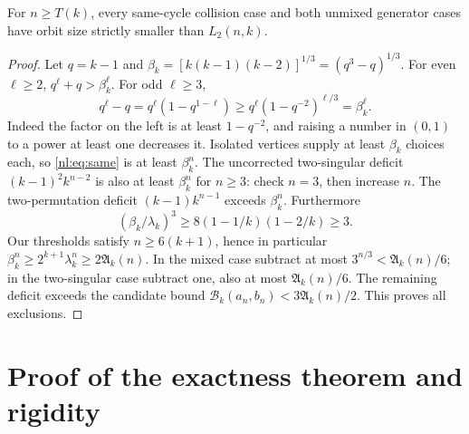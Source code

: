 \documentclass[11pt,a4paper]{article}
\numberwithin{equation}{section}
\theoremstyle{definition}
\theoremstyle{remark}
\newcommand{\Bip}{\mathcal B}
\newcommand{\nlenv}{\mathfrak A}
\begin{document}
\begin{lemma}\label{nl:lem:othercases}
For $n\ge T(k)$, every same-cycle collision case and both unmixed
generator cases have orbit size strictly smaller than $L_2(n,k)$.
\end{lemma}
\begin{proof}
Let $q=k-1$ and $\beta_k=[k(k-1)(k-2)]^{1/3}=(q^3-q)^{1/3}$.
For even $\ell\ge2$, $q^\ell+q>\beta_k^\ell$.
For odd $\ell\ge3$,
\[
 q^\ell-q=q^\ell(1-q^{1-\ell})
 \ge q^\ell(1-q^{-2})^{\ell/3}=\beta_k^\ell.
\]
Indeed the factor on the left is at least $1-q^{-2}$, and raising a
number in $(0,1)$ to a power at least one decreases it. Isolated vertices
supply at least $\beta_k$ choices each, so \eqref{nl:eq:same} is at least
$\beta_k^n$.
The uncorrected two-singular deficit $(k-1)^2k^{n-2}$ is also at least
$\beta_k^n$ for $n\ge3$: check $n=3$, then increase $n$.
The two-permutation deficit $(k-1)k^{n-1}$ exceeds $\beta_k^n$.
Furthermore
\[
 (\beta_k/\lambda_k)^3
 \ge8(1-1/k)(1-2/k)\ge3.
\]
Our thresholds satisfy $n\ge6(k+1)$, hence in particular
$\beta_k^n\ge2^{k+1}\lambda_k^n\ge2\nlenv_k(n)$.
In the mixed case subtract at most $3^{n/3}<\nlenv_k(n)/6$;
in the two-singular case subtract one, also at most $\nlenv_k(n)/6$.
The remaining deficit exceeds the candidate bound
$\Bip_k(a_n,b_n)<3\nlenv_k(n)/2$. This proves all exclusions.
\end{proof}

\section{Proof of the exactness theorem and rigidity}\label{nl:sec:exact}
\end{document}
